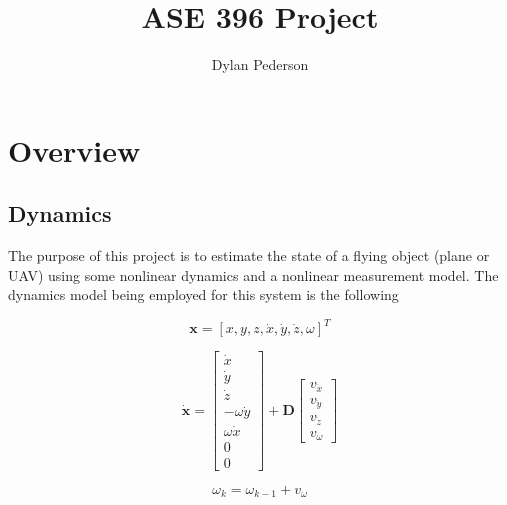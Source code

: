 \documentclass{article}
\begin{document}
\renewcommand{\theFancyVerbLine}{
  \sffamily\textcolor[rgb]{0.5,0.5,0.5}{\scriptsize\arabic{FancyVerbLine}}}


\title{ASE 396 Project}
\author{Dylan Pederson}

\maketitle

\section{Overview}

\subsection{Dynamics}

The purpose of this project is to estimate the state of a flying object (plane or UAV) using some nonlinear dynamics and a nonlinear measurement model. The dynamics model being employed for this system is the following

\begin{equation}\label{eqn:state_vector}
	\mathbf{x} = [x, y, z, \dot{x}, \dot{y}, \dot{z}, \omega]^T
\end{equation}

\begin{equation}\label{eqn:dynamics_model}
	\dot{\mathbf{x}} = \begin{bmatrix}
	       \dot{x} \\
	       \dot{y}\\
	       \dot{z}\\
	       -\omega\dot{y}\\
	       \omega\dot{x}\\
	       0\\
	       0
	\end{bmatrix}
	+ \mathbf{D}
	\begin{bmatrix}
		v_{\ddot{x}} \\
		v_{\ddot{y}} \\
		v_{\ddot{z}} \\
		v_{\omega}
	\end{bmatrix}
\end{equation}

\begin{equation}\label{eqn:discrete_turning}
	\omega_k = \omega_{k-1} + v_{\omega}
\end{equation}
\end{document}
